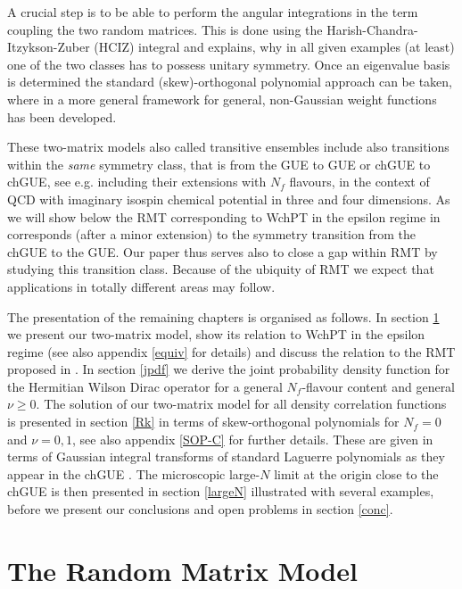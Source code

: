 \documentclass[11pt]{article}
\newcommand{\sect}[1]{\setcounter{equation}{0}\section{#1}}
\begin{document}
A crucial step is to be able to perform the angular integrations in
the term coupling the two random matrices. This is done using the
Harish-Chandra-Itzykson-Zuber (HCIZ) integral \cite{HCIZ} and
explains, why in all given examples (at least) 
one of the two classes has to possess unitary symmetry.
Once an eigenvalue basis is determined the standard (skew)-orthogonal
polynomial approach can be taken, where in \cite{NF98}
a more general framework for general, non-Gaussian 
weight functions has been developed.


These two-matrix models also called transitive ensembles include
also transitions within the {\it same} symmetry class, that is from
the GUE to GUE or chGUE to chGUE, see e.g. \cite{ADOS} including their
extensions 
with $N_f$ flavours, 
in the context of QCD with imaginary isospin chemical potential in three
and four dimensions. 
As we will show below the RMT corresponding to WchPT in the epsilon
regime in \cite{DSV,ADSV} corresponds (after a minor extension) to the symmetry
transition from the chGUE to the GUE. 
Our paper thus serves also to close a gap within RMT by studying this
transition class. Because of the 
ubiquity of RMT we expect that applications in totally different areas
may follow. 



The presentation of the remaining chapters is organised as follows. In
section \ref{MM} we present our two-matrix model, show its relation to
WchPT in the epsilon regime (see also appendix \ref{equiv} for
details) and discuss the relation to the RMT proposed in
\cite{DSV,ADSV}. 
In section \ref{jpdf} we derive the joint probability density function
for the Hermitian Wilson Dirac operator for a general $N_f$-flavour
content and general $\nu\geq0$. 
The solution of our two-matrix model for all density correlation
functions is presented in section \ref{Rk} in terms of skew-orthogonal
polynomials for $N_f=0$ and $\nu=0,1$, see also appendix \ref{SOP-C} for further
details. These are given in terms of Gaussian integral transforms of
standard Laguerre polynomials as they appear in the chGUE
\cite{SV93}. 
The microscopic large-$N$ limit at the origin close to the chGUE is
then presented in 
section \ref{largeN} 
illustrated with several examples, before we present our conclusions
and open problems in section \ref{conc}. 







\sect{The Random Matrix Model}\label{MM}
\end{document}
